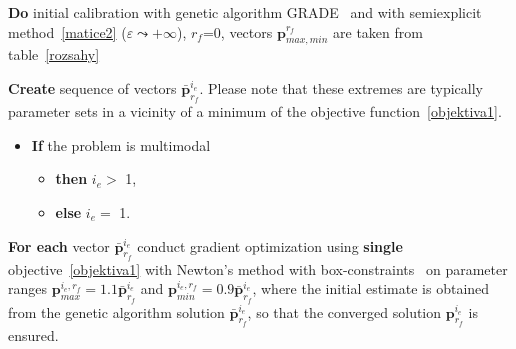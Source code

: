 \documentclass[review,times,3p,10pt]{elsarticle}
\renewcommand{\vec}{\mathbf}
\begin{document}
 \begin{enumerate}[label={\bf [\Roman*.]}]
    \item  {\bf Do} initial calibration  with genetic algorithm GRADE~\citep{grade} and with semiexplicit method~\eqref{matice2} ($\varepsilon \leadsto +\infty$), $r_f$=0,  vectors $\vec{p}_{max,min}^{r_f}$ are taken from table~\ref{rozsahy}
     \item \label{docal} {\bf Create}  sequence of vectors $\vec{\bar{p}}^{i_e}_{r_f}$.{ Please note that these extremes are typically parameter sets in a vicinity of a minimum of the objective function~\eqref{objektiva1}.}
         \begin{itemize} \item {\bf If} the problem is multimodal 
       \begin{itemize} 
           \item {\bf then} $i_e > $ 1, 
           \item {\bf else} $i_e = $ 1.
       \end{itemize} 
       \end{itemize}
      \item \label{gradient} {{\bf For each } vector  $\vec{\bar{p}}^{i_e}_{r_f}$ conduct gradient optimization using {\bf single} objective~\eqref{objektiva1} with Newton's method with box-constraints~\citep{byrd1995} on parameter ranges $\vec{p}^{i_e, r_f}_{max} = 1.1\vec{\bar{p}}^{i_e}_{r_f}$ and $\vec{p}^{i_e, r_f}_{min} = 0.9\vec{\bar{p}}^{i_e}_{r_f}$, where the initial estimate is obtained from the genetic algorithm solution $\vec{\bar{p}}^{i_e}_{r_f}$, so that the converged solution $\vec{p}^{i_e}_{r_f}$ is ensured. }


\end{enumerate}
\end{document}
